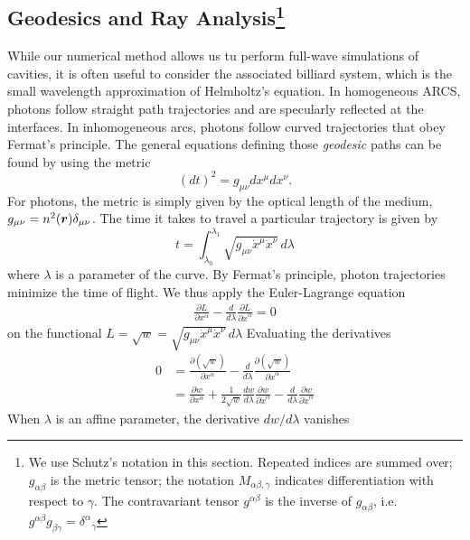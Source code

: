 \subsection{Geodesics and Ray Analysis\footnote{We use Schutz's \cite{SCH2009} notation in this section.
Repeated indices are summed over; $g_{\alpha\beta}$ is the metric tensor; the notation 
$M_{\alpha\beta,\gamma}$ indicates differentiation with respect to $\gamma$. The contravariant
tensor $g^{\alpha\beta}$ is the inverse of $g_{\alpha\beta}$, i.e. $g^{\alpha\beta}g_{\beta\gamma}={\delta^\alpha}_\gamma$}}
While our numerical method allows us tu perform full-wave
simulations of cavities, it is often useful to consider the associated
billiard system, which is the small wavelength approximation of 
Helmholtz's equation. In homogeneous ARCS, photons follow straight path
trajectories and are specularly reflected at the interfaces. In inhomogeneous
\glspl{arc}, photons follow curved trajectories that obey Fermat's principle. 
The general equations defining those \textit{geodesic} paths can be found
by using the metric
  \begin{equation}
   (dt)^2=g_{\mu\nu}dx^\mu dx^\nu. 
  \end{equation}
For photons, the metric is simply given by the optical length 
of the medium, $g_{\mu\nu}=n^2(\boldsymbol{r})\delta_{\mu\nu}$. 
The time it takes to travel a particular trajectory is given by
  \begin{equation}
   t = \int_{\lambda_0}^{\lambda_1} \sqrt{g_{\mu\nu}\dot{x}^\mu\dot{x}^\nu}\,d\lambda
  \end{equation}
where $\lambda$ is a parameter of the curve. By Fermat's principle, photon 
trajectories minimize the time of flight. We thus apply the Euler-Lagrange
equation 
  \begin{align}
   \frac{\partial L}{\partial x^\alpha}-\frac{d}{d\lambda}\frac{\partial L}{\partial\dot{x}^\alpha}=0
  \end{align}
on the functional $L=\sqrt{w}=\sqrt{g_{\mu\nu}\dot{x}^\mu\dot{x}^\nu}\,d\lambda$ Evaluating the derivatives
  \begin{align*}
  0	&=\frac{\partial\left(\sqrt{w}\right)}{\partial x^\alpha}-\frac{d}{d\lambda}\frac{\partial\left(\sqrt{w}\right)}{\partial\dot{x}^\alpha}	\\
  {}	&=\frac{\partial w}{\partial x^\alpha}+\frac{1}{2\sqrt{w}}\frac{dw}{d\lambda}\frac{\partial w}{\partial\dot{x}^\alpha}-\frac{d}{d\lambda}\frac{\partial w}{\partial\dot{x}^\alpha}
  \end{align*}
When $\lambda$ is an affine parameter, the derivative $dw/d\lambda$ vanishes \cite{TOP2005,SCH2009}
